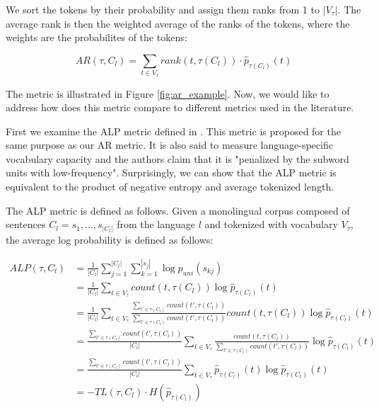 We sort the tokens by their probability and assign them ranks from 1 to $|V_\tau|$. The average rank is then the weighted average of the ranks of the tokens, where the weights are the probabilites of the tokens:

\begin{equation}
    AR(\tau, C_l) = \sum_{t \in V_\tau} rank(t, \tau(C_l)) \cdot \hat{p}_{\tau(C_l)}(t)
\end{equation}

The metric is illustrated in Figure \ref{fig:ar_example}. Now, we would like to address how does this metric compare to different metrics used in the literature. 

First we examine the ALP metric defined in \citet{zheng_allocating_2021}. This metric is proposed for the same purpose as our AR metric. It is also said to measure language-specific vocabulary capacity and the authors claim that it is "penalized by the subword units with low-frequency". Surprisingly, we can show that the ALP metric is equivalent to the product of negative entropy and average tokenized length.

The ALP metric is defined as follows. Given a monolingual corpus composed of sentences $C_l = {s_1, ..., s_{|C_l|}}$ from the language $l$ and tokenized with vocabulary $V_\tau$, the average log probability is defined as follows:

\begin{align}
ALP(\tau, C_l) &= \frac{1}{|C_l|} \sum_{j=1}^{|C_l|} \sum_{k=1}^{|s_j|} \log p_{uni}(s_{kj}) \\
&= \frac{1}{|C_l|} \sum_{t \in V_\tau} count(t, \tau(C_l)) \log \hat{p}_{\tau(C_l)}(t) \\
&= \frac{1}{|C_l|} \sum_{t \in V_\tau} \frac{\sum_{t' \in \tau(C_l)} count(t', \tau(C_l))}{\sum_{t' \in \tau(C_l)} count(t', \tau(C_l))} count(t, \tau(C_l)) \log \hat{p}_{\tau(C_l)}(t) \\
&= \frac{\sum_{t' \in \tau(C_l)} count(t', \tau(C_l))}{|C_l|} \sum_{t \in V_\tau} \frac{count(t, \tau(C_l))}{\sum_{t' \in \tau(C_l)} count(t', \tau(C_l))} \log \hat{p}_{\tau(C_l)}(t) \\
&= \frac{\sum_{t' \in \tau(C_l)} count(t', \tau(C_l))}{|C_l|} \sum_{t \in V_\tau} \hat{p}_{\tau(C_l)}(t) \log \hat{p}_{\tau(C_l)}(t) \\
&= - TL(\tau, C_l) \cdot H(\hat{p}_{\tau(C_l)})
\end{align}


